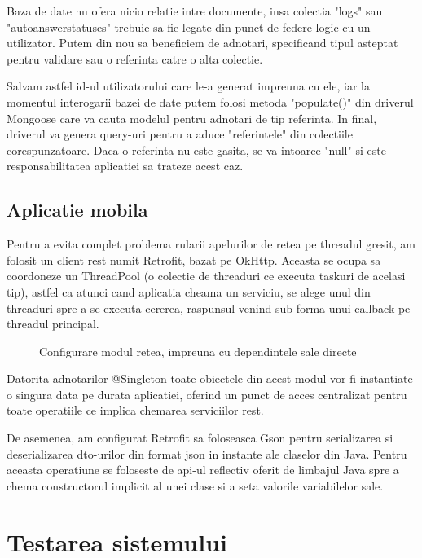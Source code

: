 Baza de date nu ofera nicio relatie intre documente, insa colectia "logs" sau "autoanswerstatuses" trebuie sa fie legate din punct de federe logic cu un utilizator. Putem din nou sa beneficiem de adnotari, specificand tipul asteptat pentru validare sau o referinta catre o alta colectie.

Salvam astfel id-ul utilizatorului care le-a generat impreuna cu ele, iar la momentul interogarii bazei de date putem folosi metoda "populate()" din driverul Mongoose care va cauta modelul pentru adnotari de tip referinta. In final, driverul va genera query-uri pentru a aduce "referintele" din colectiile corespunzatoare. Daca o referinta nu este gasita, se va intoarce "null" si este responsabilitatea aplicatiei sa trateze acest caz. 

\subsection {Aplicatie mobila}

Pentru a evita complet problema rularii apelurilor de retea pe threadul gresit, am folosit un client \acrshort{rest} numit Retrofit, bazat pe OkHttp. Aceasta se ocupa sa coordoneze un ThreadPool (o colectie de threaduri ce executa taskuri de acelasi tip), astfel ca atunci cand aplicatia cheama un serviciu, se alege unul din threaduri spre a se executa cererea, raspunsul venind sub forma unui callback pe threadul principal.

\begin{figure}[H]
  \centering
  \caption{Configurare modul retea, impreuna cu dependintele sale directe}
\end{figure}

Datorita adnotarilor @Singleton toate obiectele din acest modul vor fi instantiate o singura data pe durata aplicatiei, oferind un punct de acces centralizat pentru toate operatiile ce implica chemarea serviciilor \acrshort{rest}.

De asemenea, am configurat Retrofit sa foloseasca Gson pentru serializarea si deserializarea \acrshort{dto}-urilor din format \acrshort{json} in instante ale claselor din Java. Pentru aceasta operatiune se foloseste de \acrshort{api}-ul reflectiv oferit de limbajul Java spre a chema constructorul implicit al unei clase si a seta valorile variabilelor sale.

\section {Testarea sistemului}

